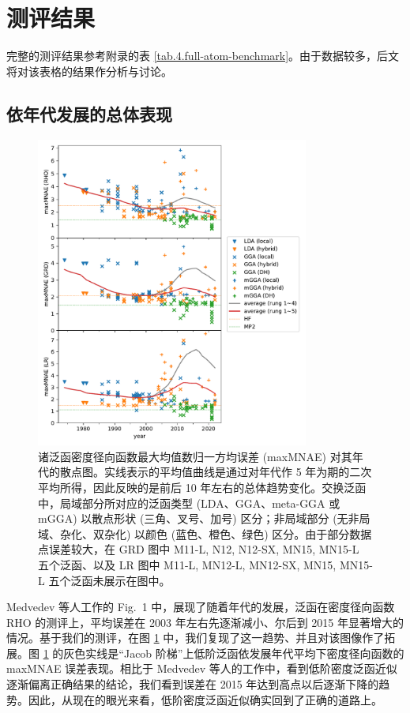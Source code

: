 \section{测评结果}

完整的测评结果参考附录的表 \ref{tab.4.full-atom-benchmark}。由于数据较多，后文将对该表格的结果作分析与讨论。

\subsection{依年代发展的总体表现}

\begin{figure}[tp]
    \centering
    \includegraphics[width=0.8\textwidth]{assets/maxMNAE-against-year.pdf}
    \caption{诸泛函密度径向函数最大均值数归一方均误差 (maxMNAE) 对其年代的散点图。实线表示的平均值曲线是通过对年代作 5 年为期的二次平均所得，因此反映的是前后 10 年左右的总体趋势变化。交换泛函中，局域部分所对应的泛函类型 (LDA、GGA、meta-GGA 或 mGGA) 以散点形状 (三角、叉号、加号) 区分；非局域部分 (无非局域、杂化、双杂化) 以颜色 (蓝色、橙色、绿色) 区分。由于部分数据点误差较大，在 GRD 图中 M11-L, N12, N12-SX, MN15, MN15-L 五个泛函、以及 LR 图中 M11-L, MN12-L, MN12-SX, MN15, MN15-L 五个泛函未展示在图中。}
    \label{fig.4.maxMNAE-against-year}
\end{figure}

Medvedev 等人工作的 Fig.\ 1 中，展现了随着年代的发展，泛函在密度径向函数 RHO 的测评上，平均误差在 2003 年左右先逐渐减小、尔后到 2015 年显著增大的情况。基于我们的测评，在图 \ref{fig.4.maxMNAE-against-year} 中，我们复现了这一趋势、并且对该图像作了拓展。图 \ref{fig.4.maxMNAE-against-year} 的灰色实线是“Jacob 阶梯”上低阶泛函依发展年代平均下密度径向函数的 maxMNAE 误差表现。相比于 Medvedev 等人的工作中，看到低阶密度泛函近似逐渐偏离正确结果的结论，我们看到误差在 2015 年达到高点以后逐渐下降的趋势。因此，从现在的眼光来看，低阶密度泛函近似确实回到了正确的道路上。

